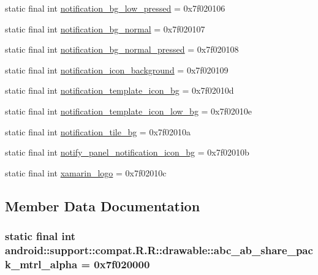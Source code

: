 \begin{CompactItemize}
\item 
static final int \hyperlink{classandroid_1_1support_1_1compat_1_1_r_1_1drawable_f745138c263b327777f96cf98ffa3cb1}{notification\_\-bg\_\-low\_\-pressed} = 0x7f020106
\item 
static final int \hyperlink{classandroid_1_1support_1_1compat_1_1_r_1_1drawable_e48e47728a38151c56bc1904ac43e01b}{notification\_\-bg\_\-normal} = 0x7f020107
\item 
static final int \hyperlink{classandroid_1_1support_1_1compat_1_1_r_1_1drawable_13b64ede104aa74035e5ba594783e2a8}{notification\_\-bg\_\-normal\_\-pressed} = 0x7f020108
\item 
static final int \hyperlink{classandroid_1_1support_1_1compat_1_1_r_1_1drawable_f15b6406983e8c18d88ce7788bb5a490}{notification\_\-icon\_\-background} = 0x7f020109
\item 
static final int \hyperlink{classandroid_1_1support_1_1compat_1_1_r_1_1drawable_5e8e7689748cbdb7bc2b6de571c03764}{notification\_\-template\_\-icon\_\-bg} = 0x7f02010d
\item 
static final int \hyperlink{classandroid_1_1support_1_1compat_1_1_r_1_1drawable_41a42e77c2d2b303e69799893aa6d553}{notification\_\-template\_\-icon\_\-low\_\-bg} = 0x7f02010e
\item 
static final int \hyperlink{classandroid_1_1support_1_1compat_1_1_r_1_1drawable_a4d6f8ffe7d376bf7405cdfa59ab9a64}{notification\_\-tile\_\-bg} = 0x7f02010a
\item 
static final int \hyperlink{classandroid_1_1support_1_1compat_1_1_r_1_1drawable_9f7eb4f58f9dbca09ec57c5dae9de5f1}{notify\_\-panel\_\-notification\_\-icon\_\-bg} = 0x7f02010b
\item 
static final int \hyperlink{classandroid_1_1support_1_1compat_1_1_r_1_1drawable_a0a92bb741b5c21be884a27ce63f32fb}{xamarin\_\-logo} = 0x7f02010c
\end{CompactItemize}


\subsection{Member Data Documentation}
\hypertarget{classandroid_1_1support_1_1compat_1_1_r_1_1drawable_37243e447f9f0a3cabf2459ed11959b6}{
\subsubsection[{abc\_\-ab\_\-share\_\-pack\_\-mtrl\_\-alpha}]{\setlength{\rightskip}{0pt plus 5cm}static final int android::support::compat.R.R::drawable::abc\_\-ab\_\-share\_\-pack\_\-mtrl\_\-alpha = 0x7f020000}}
\label{classandroid_1_1support_1_1compat_1_1_r_1_1drawable_37243e447f9f0a3cabf2459ed11959b6}



